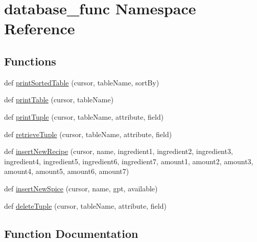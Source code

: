 \hypertarget{namespacedatabase__func}{}\section{database\+\_\+func Namespace Reference}
\label{namespacedatabase__func}
\subsection*{Functions}
\begin{DoxyCompactItemize}
\item 
def \hyperlink{namespacedatabase__func_aa5f5f9cdd218f8b83c7f82e435768eb4}{print\+Sorted\+Table} (cursor, table\+Name, sort\+By)
\item 
def \hyperlink{namespacedatabase__func_a8412e6bd774d21596558269ce30ae456}{print\+Table} (cursor, table\+Name)
\item 
def \hyperlink{namespacedatabase__func_a847282776b78122937ff0fde37f6acfc}{print\+Tuple} (cursor, table\+Name, attribute, field)
\item 
def \hyperlink{namespacedatabase__func_a6ef8b46041e7a4f2dcae1f9cc7c4973a}{retrieve\+Tuple} (cursor, table\+Name, attribute, field)
\item 
def \hyperlink{namespacedatabase__func_ae04786ac0ae30856f0fdbb618d536697}{insert\+New\+Recipe} (cursor, name, ingredient1, ingredient2, ingredient3, ingredient4, ingredient5, ingredient6, ingredient7, amount1, amount2, amount3, amount4, amount5, amount6, amount7)
\item 
def \hyperlink{namespacedatabase__func_a819131327a7247b2e0d29d0efba4a708}{insert\+New\+Spice} (cursor, name, gpt, available)
\item 
def \hyperlink{namespacedatabase__func_ad2402fd318e4edf3b566504f660c4880}{delete\+Tuple} (cursor, table\+Name, attribute, field)
\end{DoxyCompactItemize}


\subsection{Function Documentation}
